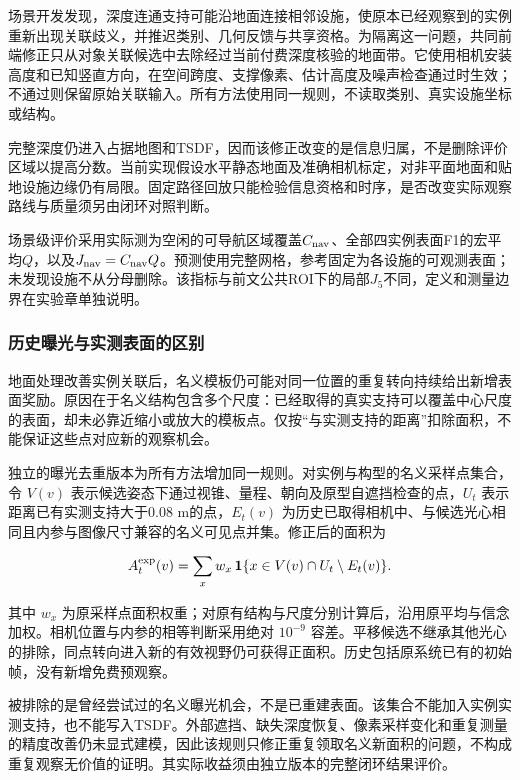 \documentclass[11pt,a4paper]{article}
\numberwithin{equation}{section}
\begin{document}
场景开发发现，深度连通支持可能沿地面连接相邻设施，使原本已经观察到的实例重新出现关联歧义，并推迟类别、几何反馈与共享资格。为隔离这一问题，共同前端修正只从对象关联候选中去除经过当前付费深度核验的地面带。它使用相机安装高度和已知竖直方向，在空间跨度、支撑像素、估计高度及噪声检查通过时生效；不通过则保留原始关联输入。所有方法使用同一规则，不读取类别、真实设施坐标或结构。

完整深度仍进入占据地图和TSDF，因而该修正改变的是信息归属，不是删除评价区域以提高分数。当前实现假设水平静态地面及准确相机标定，对非平面地面和贴地设施边缘仍有局限。固定路径回放只能检验信息资格和时序，是否改变实际观察路线与质量须另由闭环对照判断。

场景级评价采用实际测为空闲的可导航区域覆盖\(C_{\rm nav}\)、全部四实例表面F1的宏平均\(Q\)，以及\(J_{\rm nav}=C_{\rm nav}Q\)。预测使用完整网格，参考固定为各设施的可观测表面；未发现设施不从分母删除。该指标与前文公共ROI下的局部\(J_5\)不同，定义和测量边界在实验章单独说明。

\hypertarget{ux5386ux53f2ux66ddux5149ux4e0eux5b9eux6d4bux8868ux9762ux7684ux533aux522b}{%
\subsubsection{历史曝光与实测表面的区别}\label{ux5386ux53f2ux66ddux5149ux4e0eux5b9eux6d4bux8868ux9762ux7684ux533aux522b}}

地面处理改善实例关联后，名义模板仍可能对同一位置的重复转向持续给出新增表面奖励。原因在于名义结构包含多个尺度：已经取得的真实支持可以覆盖中心尺度的表面，却未必靠近缩小或放大的模板点。仅按``与实测支持的距离''扣除面积，不能保证这些点对应新的观察机会。

独立的曝光去重版本为所有方法增加同一规则。对实例与构型的名义采样点集合，令 \(V(v)\) 表示候选姿态下通过视锥、量程、朝向及原型自遮挡检查的点，\(U_t\) 表示距离已有实测支持大于0.08 m的点，\(E_t(v)\) 为历史已取得相机中、与候选光心相同且内参与图像尺寸兼容的名义可见点并集。修正后的面积为

\begin{equation}
A^{\rm exp}_t(v)=\sum_x w_x\,\mathbf 1\{x\in V(v)\cap U_t\setminus E_t(v)\}.
\end{equation}

其中 \(w_x\) 为原采样点面积权重；对原有结构与尺度分别计算后，沿用原平均与信念加权。相机位置与内参的相等判断采用绝对 \(10^{-9}\) 容差。平移候选不继承其他光心的排除，同点转向进入新的有效视野仍可获得正面积。历史包括原系统已有的初始帧，没有新增免费预观察。

被排除的是曾经尝试过的名义曝光机会，不是已重建表面。该集合不能加入实例实测支持，也不能写入TSDF。外部遮挡、缺失深度恢复、像素采样变化和重复测量的精度改善仍未显式建模，因此该规则只修正重复领取名义新面积的问题，不构成重复观察无价值的证明。其实际收益须由独立版本的完整闭环结果评价。
\end{document}
